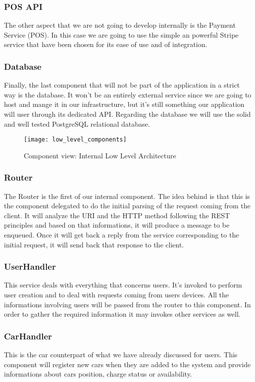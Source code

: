 \subsubsection{POS API}
The other aspect that we are not going to develop internally is the Payment Service (POS).
In this case we are going to use the simple an powerful Stripe service that have been chosen
for its ease of use and of integration.
\subsubsection{Database}
Finally, the last component that will not be part of the application in a strict way is the database.
It won't be an entirely external service since we are going to host and mange it in our infrastructure,
but it's still something our application will user through its dedicated API. Regarding the
database we will use the solid and well tested PostgreSQL relational database.

\begin{sidewaysfigure}
\centering
\texttt{[image: low\_level\_components]}
\caption{Component view: Internal Low Level Architecture}
\label{fig:i_l_l_comp}
\end{sidewaysfigure}

\pagebreak
\subsubsection{Router}
The Router is the first of our internal component. The idea behind is that this is the component
delegated to do the initial parsing of the request coming from the client. It will analyze
the URI and the HTTP method following the REST principles and based on that informations,
it will produce a message to be enqueued. Once it will get back a reply from the service
corresponding to the initial request, it will send back that response to the client.

\subsubsection{UserHandler}
This service deals with everything that concerns users. It's invoked to perform user creation
and to deal with requests coming from users devices. All the informations involving users
will be passed from the router to this component. In order to gather the required information
it may invokes other services as well.

\subsubsection{CarHandler}
This is the car counterpart of what we have already discussed for users. This component will
register new cars when they are added to the system and provide informations about cars
position, charge status or availability.

